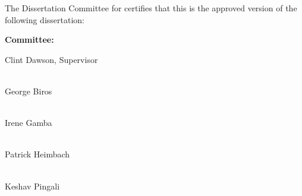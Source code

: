 \thispagestyle{empty} %
\makeatletter
\begin{center}
The Dissertation Committee for \@author\space certifies that this is the approved version of the following dissertation:

\vspace{1cm}
\textbf{
\large
\@title
}
\end{center}

\vspace{2cm}
\begin{flushright}
\textbf{Committee:}\hspace{.6\textwidth} \vspace{1cm}

Clint Dawson, Supervisor \\ \ \\
\vspace{1em}

George Biros\\ \ \\
\vspace{1em}

Irene Gamba\\ \ \\
\vspace{1em}

Patrick Heimbach\\ \ \\
\vspace{1em}

Keshav Pingali\\
\vspace{1em}
\end{flushright}

